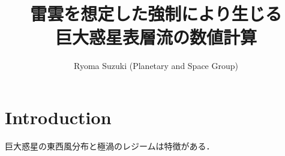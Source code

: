 \documentclass[dvipdfmx,twocolumn,10pt]{jsarticle}
\begin{document}
\pagestyle{empty}
\title{\Large 雷雲を想定した強制により生じる\\
巨大惑星表層流の数値計算}

\author{\large Ryoma Suzuki (Planetary and Space Group)}
\date{}
\maketitle
\vspace{-0.2zh}
\section{Introduction}
\vspace{-0.5zh}
巨大惑星の東西風分布と極渦のレジームは特徴がある．



\vspace{-0.2zh}
\end{document}
